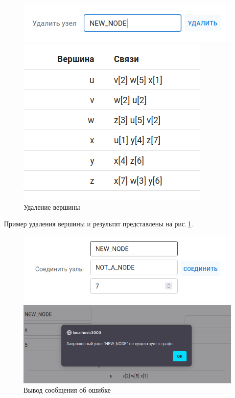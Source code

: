 \begin{figure}
  \begin{minipage}{0.5\textwidth}
    \centering\includegraphics[width=0.8\linewidth]{figs/task-1/int-9.png}
  \end{minipage}
  \begin{minipage}{0.5\textwidth}
    \centering\includegraphics[width=0.8\linewidth]{figs/task-1/int-10.png}
  \end{minipage}
  \caption{Удаление вершины}
  \label{fig:int-node-del}
\end{figure}

Пример удаления вершины и результат представлены
на рис.\,\ref{fig:int-node-del}.

\begin{figure}
  \begin{minipage}{0.5\textwidth}
    \centering\includegraphics[width=0.7\linewidth]{figs/task-1/int-7.png}
  \end{minipage}
  \begin{minipage}{0.5\textwidth}
    \centering\includegraphics[width=0.8\linewidth]{figs/task-1/int-11.png}
  \end{minipage}
  \caption{Вывод сообщения об ошибке}
  \label{fig:int-alert}
\end{figure}

